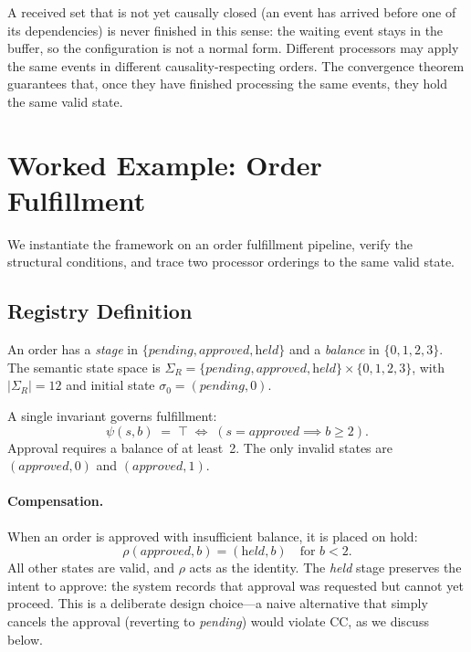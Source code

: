 \documentclass[11pt,a4paper]{article}
\theoremstyle{plain}
\theoremstyle{definition}
\theoremstyle{remark}
\renewcommand{\_}{\textunderscore\allowbreak}
\begin{document}
A received set that is not yet causally closed (an event has arrived before
one of its dependencies) is never finished in this sense: the waiting event
stays in the buffer, so the configuration is not a normal form.  Different processors may apply the same events in different
causality-respecting orders.  The convergence theorem guarantees that, once
they have finished processing the same events, they hold the same valid state.

\section{Worked Example: Order Fulfillment}
\label{sec:example}

We instantiate the framework on an order fulfillment pipeline, verify the
structural conditions, and trace two processor orderings to the same valid
state.

\subsection{Registry Definition}

An order has a \emph{stage} in $\{\textit{pending}, \textit{approved},
\textit{held}\}$ and a \emph{balance} in $\{0, 1, 2, 3\}$.  The semantic
state space is $\Sigma_R = \{\textit{pending}, \textit{approved},
\textit{held}\} \times \{0, 1, 2, 3\}$, with $|\Sigma_R| = 12$ and initial
state $\sigma_0 = (\textit{pending}, 0)$.

A single invariant governs fulfillment:
\[
\psi(s, b) \;=\; \top \;\iff\; (s = \textit{approved} \implies b \geq 2).
\]
Approval requires a balance of at least~2.  The only invalid states are
$(\textit{approved}, 0)$ and $(\textit{approved}, 1)$.

\paragraph{Compensation.}
When an order is approved with insufficient balance, it is placed on hold:
\[
\rho(\textit{approved}, b) = (\textit{held}, b) \quad \text{for } b < 2.
\]
All other states are valid, and $\rho$ acts as the identity.  The
\textit{held} stage preserves the intent to approve: the system records that
approval was requested but cannot yet proceed.  This is a deliberate design
choice---a naive alternative that simply cancels the approval (reverting to
\textit{pending}) would violate CC, as we discuss below.
\end{document}
